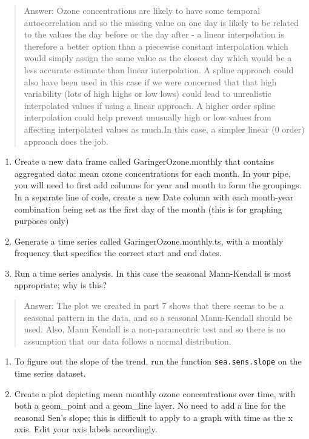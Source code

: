 \documentclass[
]{article}
\begin{document}
\begin{quote}
Answer: Ozone concentrations are likely to have some temporal
autocorrelation and so the missing value on one day is likely to be
related to the values the day before or the day after - a linear
interpolation is therefore a better option than a piecewise constant
interpolation which would simply assign the same value as the closest
day which would be a less accurate estimate than linear interpolation. A
spline approach could also have been used in this case if we were
concerned that that high variability (lots of high highs or low lows)
could lead to unrealistic interpolated values if using a linear
approach. A higher order spline interpolation could help prevent
unusually high or low values from affecting interpolated values as
much.In this case, a simpler linear (0 order) approach does the job.
\end{quote}

\begin{enumerate}
\def\labelenumi{\arabic{enumi}.}
\setcounter{enumi}{8}
\item
  Create a new data frame called GaringerOzone.monthly that contains
  aggregated data: mean ozone concentrations for each month. In your
  pipe, you will need to first add columns for year and month to form
  the groupings. In a separate line of code, create a new Date column
  with each month-year combination being set as the first day of the
  month (this is for graphing purposes only)
\item
  Generate a time series called GaringerOzone.monthly.ts, with a monthly
  frequency that specifies the correct start and end dates.
\item
  Run a time series analysis. In this case the seasonal Mann-Kendall is
  most appropriate; why is this?
\end{enumerate}

\begin{quote}
Answer: The plot we created in part 7 shows that there seems to be a
seasonal pattern in the data, and so a seasonal Mann-Kendall should be
used. Also, Mann Kendall is a non-paramentric test and so there is no
assumption that our data follows a normal distribution.
\end{quote}

\begin{enumerate}
\def\labelenumi{\arabic{enumi}.}
\setcounter{enumi}{11}
\item
  To figure out the slope of the trend, run the function
  \texttt{sea.sens.slope} on the time series dataset.
\item
  Create a plot depicting mean monthly ozone concentrations over time,
  with both a geom\_point and a geom\_line layer. No need to add a line
  for the seasonal Sen's slope; this is difficult to apply to a graph
  with time as the x axis. Edit your axis labels accordingly.
\end{enumerate}
\end{document}
